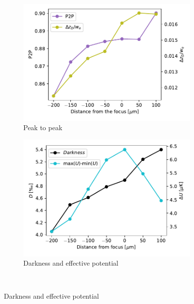 \begin{figure}
    \begin{subfigure}{0.5\textwidth}
        \includegraphics[width=\textwidth]{chapters/chapter_3/figures/p2p_focus.pdf}
        \caption{Peak to peak}
        \label{fig:p2p}
    \end{subfigure}
    \begin{subfigure}{0.5\textwidth}
        \includegraphics[width=\textwidth]{chapters/chapter_3/figures/darkenss_focus.pdf}
        \caption{Darkness and effective potential}
        \label{fig:focus_darkenss}
    \end{subfigure}\\


\end{figure}
